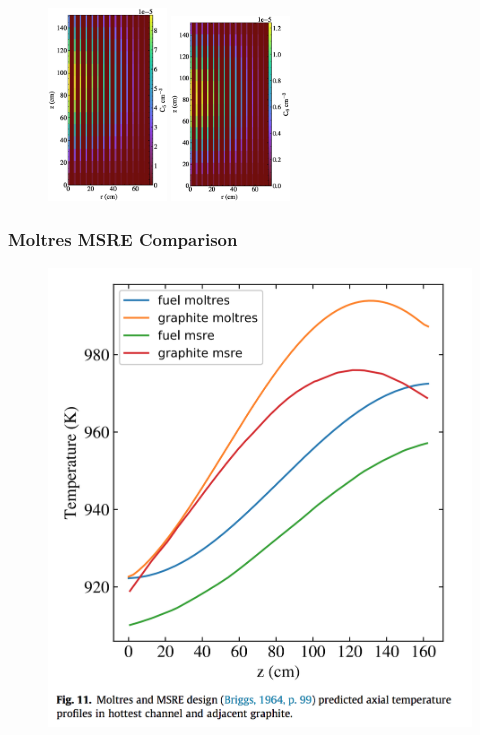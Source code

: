 \begin{frame}
\begin{figure}
   \includegraphics[width=0.28\textwidth]{./images/auto_diff_rho_pre5.eps}
   \includegraphics[width=0.28\textwidth]{./images/auto_diff_rho_pre6.eps}
    \end{figure}
\end{frame}



\begin{frame}
        \frametitle{Moltres MSRE Comparison}
  \begin{figure}
   \vspace{-0.05in}
   \includegraphics[height=0.85\textheight]{./images/moltres-axial.png}
    \end{figure}
\end{frame}


